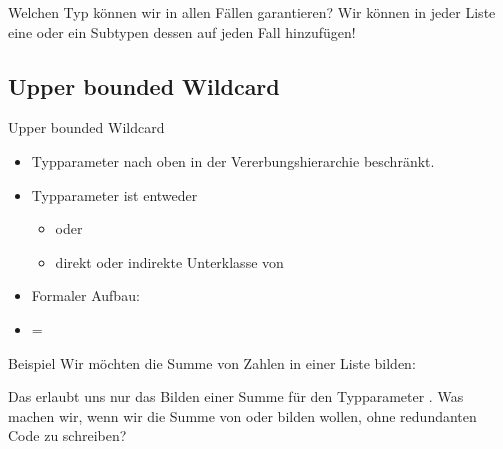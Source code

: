 \documentclass{../tuda-beamer}
\begin{document}
    \begin{frame}[c]{Welchen Typ können wir in allen Fällen garantieren?}
        Wir können in jeder Liste eine  oder ein Subtypen dessen
        auf jeden Fall hinzufügen!

        
    \end{frame}

    \subsection{Upper bounded Wildcard}
    \label{subsec:wildcards-upperbound}
    \begin{frame}[c]{Upper bounded Wildcard}
        \begin{itemize}
            \item Typparameter nach oben in der Vererbungshierarchie beschränkt.
            \item Typparameter ist entweder
            \begin{itemize}
                \item {} oder
                \item direkt oder indirekte Unterklasse von 
            \end{itemize}
            \item Formaler Aufbau: 
            \item {} = 
        \end{itemize}
    \end{frame}

    \begin{frame}[c]{Beispiel}
        Wir möchten die Summe von Zahlen in einer Liste bilden:

        

        \pause

        Das erlaubt uns nur das Bilden einer Summe für den Typparameter
        .
        Was machen wir, wenn wir die Summe von  oder 
        bilden wollen, ohne redundanten Code zu schreiben?
    \end{frame}

    \begin{frame}[c]
        
    \end{frame}
\end{document}
